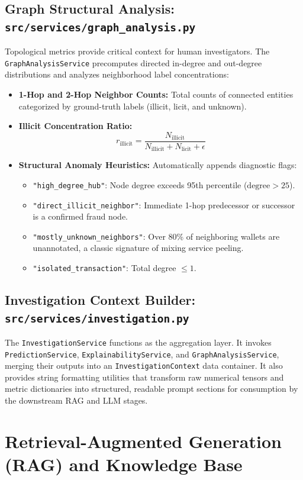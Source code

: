 \documentclass[11pt,a4paper]{report}
\begin{document}
\section{Graph Structural Analysis: \texttt{src/services/graph\_analysis.py}}
Topological metrics provide critical context for human investigators. The \texttt{GraphAnalysisService} precomputes directed in-degree and out-degree distributions and analyzes neighborhood label concentrations:
\begin{itemize}[leftmargin=1.5em]
  \item \textbf{1-Hop and 2-Hop Neighbor Counts:} Total counts of connected entities categorized by ground-truth labels (illicit, licit, and unknown).
  \item \textbf{Illicit Concentration Ratio:}
  \[
  r_{\text{illicit}} = \frac{N_{\text{illicit}}}{N_{\text{illicit}} + N_{\text{licit}} + \epsilon}
  \]
  \item \textbf{Structural Anomaly Heuristics:} Automatically appends diagnostic flags:
  \begin{itemize}
    \item \texttt{"high\_degree\_hub"}: Node degree exceeds 95th percentile ($\text{degree} > 25$).
    \item \texttt{"direct\_illicit\_neighbor"}: Immediate 1-hop predecessor or successor is a confirmed fraud node.
    \item \texttt{"mostly\_unknown\_neighbors"}: Over 80\% of neighboring wallets are unannotated, a classic signature of mixing service peeling.
    \item \texttt{"isolated\_transaction"}: Total degree $\le 1$.
  \end{itemize}
\end{itemize}

\section{Investigation Context Builder: \texttt{src/services/investigation.py}}
The \texttt{InvestigationService} functions as the aggregation layer. It invokes \texttt{PredictionService}, \texttt{ExplainabilityService}, and \texttt{GraphAnalysisService}, merging their outputs into an \texttt{InvestigationContext} data container. It also provides string formatting utilities that transform raw numerical tensors and metric dictionaries into structured, readable prompt sections for consumption by the downstream RAG and LLM stages.

\chapter{Retrieval-Augmented Generation (RAG) and Knowledge Base}
\end{document}
